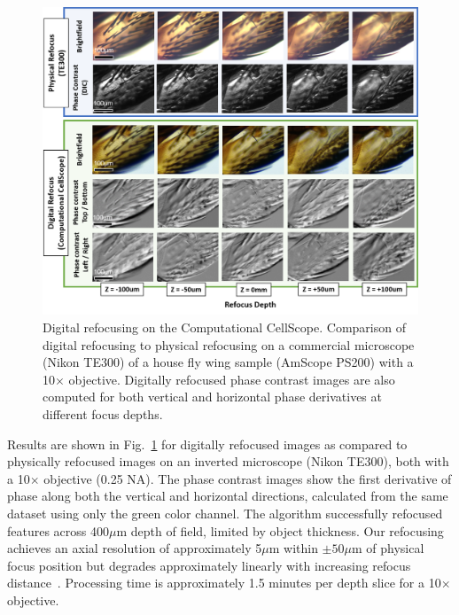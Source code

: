 \begin{figure}
\begin{center}
\includegraphics[width=\textwidth]{figures/fig_ccs_refocus.png}
\end{center}

\caption { {Digital refocusing on the Computational CellScope.} Comparison of digital refocusing to physical refocusing on a commercial microscope (Nikon TE300) of a house fly wing sample (AmScope PS200) with a 10$\times$ objective. Digitally refocused phase contrast images are also computed for both vertical and horizontal phase derivatives at different focus depths.}

\label{fig:fabrication:digrefocus}
\end{figure}

Results are shown in Fig.~\ref{fig:fabrication:digrefocus} for digitally refocused images as compared to physically refocused images on an inverted microscope (Nikon TE300), both with a 10$\times$ objective (0.25 NA). The phase contrast images show the first derivative of phase along both the vertical and horizontal directions, calculated from the same dataset using only the green color channel. The algorithm successfully refocused features across 400$\mu$m depth of field, limited by object thickness. Our refocusing achieves an axial resolution of approximately 5$\mu$m within $\pm50\mu$m of physical focus position but degrades approximately linearly with increasing refocus distance~\cite{Tian14}. Processing time is approximately 1.5 minutes per depth slice for a 10$\times$ objective.


